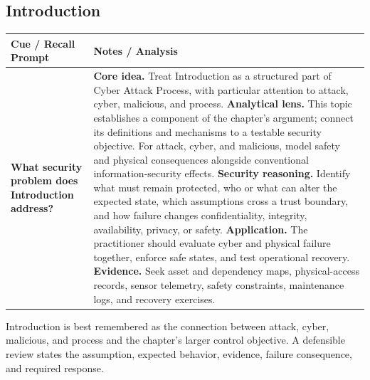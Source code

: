 \documentclass[11pt]{article}
\newcommand{\CornellHeader}{%
\rowcolor{Navy}\color{white}\bfseries Cue / Recall Prompt & \color{white}\bfseries Notes / Analysis\\\hline}
\newcommand{\CornellRow}[2]{%
\cellcolor{CueGray}\RaggedRight\textbf{#1} & \RaggedRight #2\\\hline}
\begin{document}
\subsection*{Introduction}
\begin{longtable}{>{\RaggedRight\arraybackslash}p{}|>{\RaggedRight\arraybackslash}p{}}
\CornellHeader
\CornellRow{What security problem does Introduction address?}{\textbf{Core idea.} Treat Introduction as a structured part of Cyber Attack Process, with particular attention to attack, cyber, malicious, and process. \textbf{Analytical lens.} This topic establishes a component of the chapter's argument; connect its definitions and mechanisms to a testable security objective. For attack, cyber, and malicious, model safety and physical consequences alongside conventional information-security effects. \textbf{Security reasoning.} Identify what must remain protected, who or what can alter the expected state, which assumptions cross a trust boundary, and how failure changes confidentiality, integrity, availability, privacy, or safety. \textbf{Application.} The practitioner should evaluate cyber and physical failure together, enforce safe states, and test operational recovery. \textbf{Evidence.} Seek asset and dependency maps, physical-access records, sensor telemetry, safety constraints, maintenance logs, and recovery exercises.}
\end{longtable}
\begin{topicsummary}
Introduction is best remembered as the connection between attack, cyber, malicious, and process and the chapter's larger control objective. A defensible review states the assumption, expected behavior, evidence, failure consequence, and required response.
\end{topicsummary}
\end{document}
